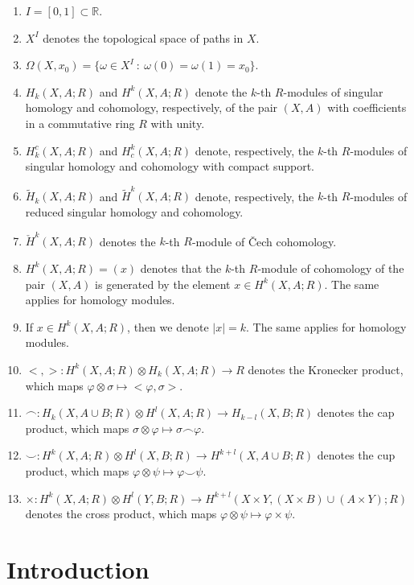 \documentclass[12pt,oneside]{book}
\newcommand{\R}{\mathbb{R}}
\newcommand{\ccup}{\smile}
\newcommand{\ccap}{\frown}
\newcommand{\tensor}{\otimes}
\newcommand{\wt}{\widetilde}
\begin{document}
\begin{enumerate}
        \item $I=[0,1]\subset \R$.
        \item $X^{I}$ denotes the topological space of paths in $X$.
        \item $\Omega(X,x_{0})=\{ \omega\in X^{I} \ : \ \omega(0)=\omega(1)=x_{0} \}$.
        \item $H_{k}(X,A;R)$ and $H^{k}(X,A;R)$ denote the $k$-th $R$-modules of singular homology and 
        cohomology, respectively, of the pair $(X,A)$ with coefficients in a commutative ring $R$ with 
        unity.
        \item $H_{k}^{c}(X,A;R)$ and $H^{k}_{c}(X,A;R)$ denote, respectively, the $k$-th $R$-modules of 
        singular homology and cohomology with compact support.
        \item $\wt{H}_{k}(X,A;R)$ and $\wt{H}^{k}(X,A;R)$ denote, respectively, the $k$-th $R$-modules of 
        reduced singular homology and cohomology.
        \item $\check{H}^{k}(X,A;R)$ denotes the $k$-th $R$-module of Čech cohomology.
        \item $H^{k}(X,A;R)=(x)$ denotes that the $k$-th $R$-module of cohomology of the pair $(X,A)$ is 
        generated by the element $x\in H^{k}(X,A;R)$. The same applies for homology modules.
        \item If $x\in H^{k}(X,A;R)$, then we denote $|x|=k$. The same applies for homology modules.
        \item $<,>:H^{k}(X,A;R)\tensor H_{k}(X,A;R)\to R$ denotes the Kronecker product, which maps 
        $\varphi\tensor\sigma\mapsto <\varphi,\sigma>$.
        \item $\ccap:H_{k}(X,A\cup B;R)\tensor H^{l}(X,A;R)\to H_{k-l}(X,B;R)$ denotes the cap product, 
        which maps $\sigma\tensor\varphi\mapsto\sigma\ccap\varphi$.
        \item $\ccup:H^{k}(X,A;R)\tensor H^{l}(X,B;R)\to H^{k+l}(X,A\cup B;R)$ denotes the cup product, 
        which maps $\varphi\tensor\psi\mapsto\varphi\ccup\psi$.
        \item $\times:H^{k}(X,A;R)\tensor H^{l}(Y,B;R)\to H^{k+l}(X\times Y,(X\times B)\cup(A\times Y);R)$ 
        denotes the cross product, which maps $\varphi\tensor\psi\mapsto\varphi\times\psi$.
        \thispagestyle{empty}
    \end{enumerate}





    \chapter{Introduction}
    \thispagestyle{empty}
\end{document}
